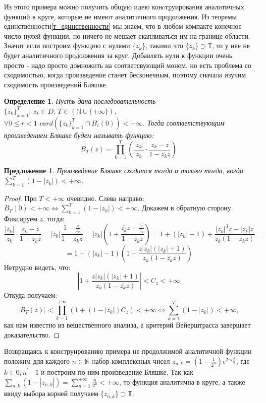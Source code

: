 \documentclass[12pt,a4paper]{article} %
\newtheorem{definition}{Определение}
\newtheorem{proposition}{Предложение}
\begin{document}
	Из этого примера можно получить общую идею конcтруирования аналитичных функций в круге, которые не имеют аналитичного продолжения. Из теоремы единственности\eqref{т_единственности} мы знаем, что в любом компакте конечное число нулей функции, но ничего не мешает скапливаться им на границе области. Значит если построим функцию с нулями $\{z_k\}$, такими что $\overline{\{z_k\}}\supset\mathbb{T}$, то у нее не будет аналитичного продолжения за круг. Добавлять нули к функции очень просто - надо просто домножить на соответсвующий моном, но есть проблема со сходимостью, когда произведение станет бесконечным, поэтому сначала изучим сходимость произведений Бляшке.
	\begin{definition}
		Пусть дана последовательность $\{z_k\}_{k=1}^T:\,z_k\in D,\,T\in(\mathbb{N}\cup\{+\infty\}),$ \\$\forall 0\leq r<1\,\,card(\{z_k\}_{k=1}^T\cap B_r(0))<+\infty$. Тогда соответствующим произведением Бляшке будем называть функцию:
		$$B_T(z)=\prod_{k=1}^T\left(\frac{|z_k|}{z_k}\cdot\frac{z_k-z}{1-\overline{z_k}z}\right)$$
	\end{definition}
	\begin{proposition}
		Произведение Бляшке сходится тогда и только тогда, когда \\$\displaystyle\sum_{k=1}^T(1-|z_k|)<+\infty$.
	\end{proposition}
	\begin{proof}
		При $T<+\infty$ очевидно. Слева направо: $B_T(0)<+\infty\Leftrightarrow\displaystyle\sum_{k=1}^T(1-|z_k|)<+\infty$. Докажем в обратную сторону. Фиксируем $z$, тогда:
		$$\frac{|z_k|}{z_k}\cdot\frac{z_k-z}{1-\overline{z_k}z}=|z_k|\frac{1-\frac{z}{z_k}}{1-\overline{z_k}z}=|z_k|\left(1+\frac{\overline{z_k}z-\frac{z}{z_k}}{1-\overline{z_k}z}\right)=1+(|z_k|-1)+\frac{|z_k|^3z-|z_k|z}{z_k(1-\overline{z_k}z)}=$$
		$$=1+(|z_k|-1)\left(1+\frac{z|z_k|(|z_k|+1)}{z_k(1-\overline{z_k}z)}\right)$$
		Нетрудно видеть, что:
		$$\left|1+\frac{z|z_k|(|z_k|+1)}{z_k(1-\overline{z_k}z)}\right|<C_z<+\infty$$
		Откуда получаем:
		$$|B_T(z)|<\prod_{k=1}^{+\infty}(1+(1-|z_k|)C_z)<+\infty\Leftrightarrow\sum_{k=1}^T(1-|z_k|)<+\infty,$$
		как нам известно из вещественного анализа, а критерий Вейерштрасса завершает доказательство.
	\end{proof}
	Возвращаясь к конструированию примера не продолжимой аналитичной функции положим для каждого $n\in\mathbb{N}$ набор комплексных чисел $z_{n,k}=(1-\frac{1}{2^n})e^{2\pi i\frac{k}{n}}$, где $k\in\overline{0,n-1}$ и построим по ним произведение Бляшке. Так как $\displaystyle\sum_{n,k}(1-|z_{n,k}|)=\sum_{n=1}^{+\infty}\frac{n}{2^n}<+\infty$, то функция аналитична в круге, а также ввиду выбора корней получаем $\overline{\{z_{n,k}\}}\supset\mathbb{T}$.
	
\end{document}
